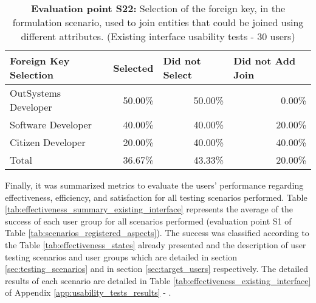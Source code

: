 \begin{table}[tb]
    \caption{\textbf{Evaluation point S22:} Selection of the foreign key, in the formulation scenario, used to join entities that could be joined using different attributes. (Existing interface usability tests - 30 users)}
    \label{tab:existingInterfaceForeignKeySelection}
    \begin{tabular}{@{}lrrr@{}}
    \toprule
    \textbf{Foreign Key Selection} & \multicolumn{1}{l}{Selected} & \multicolumn{1}{l}{Did not Select} & \multicolumn{1}{l}{Did not Add Join} \\ \midrule
    OutSystems Developer           & 50.00\%                      & 50.00\%                            & 0.00\%                               \\
    Software Developer             & 40.00\%                      & 40.00\%                            & 20.00\%                              \\
    Citizen Developer              & 20.00\%                      & 40.00\%                            & 40.00\%                              \\
    Total                          & 36.67\%                      & 43.33\%                            & 20.00\%                              \\ \bottomrule
    \end{tabular}
    \end{table}

Finally, it was summarized metrics to evaluate the users' performance regarding effectiveness, efficiency, and satisfaction for all testing scenarios performed. Table \ref{tab:effectiveness_summary_existing_interface} represents the average of the success of each user group for all scenarios performed (evaluation point S1 of Table \ref{tab:scenarios_registered_aspects}). The success was classified according to the Table \ref{tab:effectiveness_states} already presented and the description of user testing scenarios and user groups which are detailed in section \ref{sec:testing_scenarios} and in section \ref{sec:target_users} respectively. The detailed results of each scenario are detailed in Table \ref{tab:effectiveness_existing_interface} of Appendix \ref{app:usability_tests_results} - .

